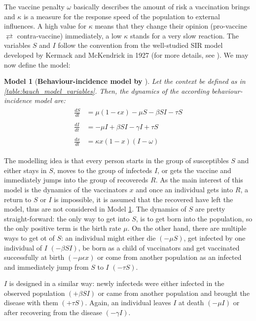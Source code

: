 \documentclass[12pt,a4paper,twoside]{article}
\newtheorem{model}{Model}[section]
\begin{document}
The vaccine penalty $\omega$ basically describes the amount of risk a vaccination brings and $\kappa$ is a measure for the response speed of the population to external influences. A high value for $\kappa$ means that they change their opinion (pro-vaccine $\rightleftarrows$ contra-vaccine) immediately, a low $\kappa$ stands for a very slow reaction. The variables $S$ and $I$ follow the convention from the well-studied \ac{SIR} model developed by Kermack and McKendrick in 1927 (for more details, see \cite{Muller2015}). We may now define the model:
\begin{model}[\textbf{Behaviour-incidence model by \cite{Bauch2012}}]\label{model:bauch}
	Let the context be defined as in \eqref{table:bauch_model_variables}. Then, the dynamics of the according behaviour-incidence model are:
	\begin{align}
	\begin{split}
	\frac{dS}{dt} &= \mu\left(1-\epsilon x\right) - \mu S - \beta SI - \tau S\\
	&\\
	\frac{dI}{dt} &= -\mu I + \beta SI - \gamma I + \tau S\\
	&\\
	\frac{dx}{dt} &= \kappa x\left(1 - x\right)\left(I - \omega\right)
	\end{split}
	\end{align}
\end{model}

The modelling idea is that every person starts in the group of susceptibles $S$ and either stays in $S$, moves to the group of infecteds $I$, or gets the vaccine and immediately jumps into the group of recovereds $R$. As the main interest of this model is the dynamics of the vaccinators $x$ and once an individual gets into $R$, a return to $S$ or $I$ is impossible, it is assumed that the recovered have left the model, thus are not considered in Model \ref{model:bauch}. The dynamics of $S$ are pretty straight-forward: the only way to get into $S$, is to get born into the population, so the only positive term is the birth rate $\mu$. On the other hand, there are multiple ways to get ot of $S$: an individual might either die $\left(-\mu S\right)$, get infected by one individual of $I$ $\left(-\beta SI\right)$, be born as a child of vaccinators and get vaccinated successfully at birth $\left(-\mu\epsilon x\right)$ or come from another population as an infected and immediately jump from $S$ to $I$ $\left(-\tau S\right)$. 

$I$ is designed in a similar way: newly infecteds were either infected in the observed population $\left(+\beta SI\right)$ or came from another population and brought the disease with them $\left(+\tau S\right)$. Again, an individual leaves $I$ at death $\left(-\mu I\right)$ or after recovering from the disease $\left(-\gamma I\right)$. 
\end{document}
